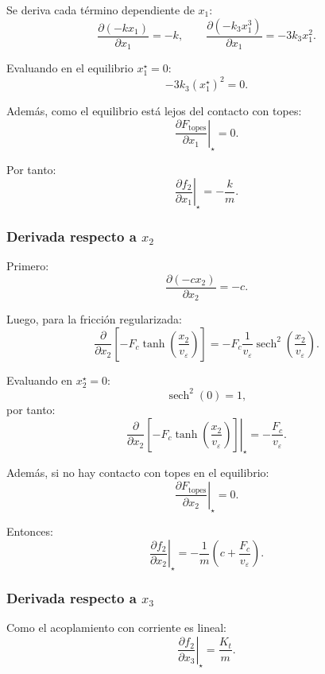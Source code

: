 \documentclass[11pt]{article}
\begin{document}
Se deriva cada t\'ermino dependiente de $x_1$:
\[
\frac{\partial (-kx_1)}{\partial x_1} = -k,
\qquad
\frac{\partial (-k_3x_1^3)}{\partial x_1} = -3k_3x_1^2.
\]

Evaluando en el equilibrio $x_1^\star=0$:
\[
-3k_3(x_1^\star)^2 = 0.
\]

Adem\'as, como el equilibrio est\'a lejos del contacto con topes:
\[
\left.\frac{\partial F_{\text{topes}}}{\partial x_1}\right|_\star = 0.
\]

Por tanto:
\begin{equation}
\left.\frac{\partial f_2}{\partial x_1}\right|_\star
=
-\frac{k}{m}.
\label{eq:df2dx1}
\end{equation}

\subsubsection{Derivada respecto a $x_2$}

Primero:
\[
\frac{\partial (-cx_2)}{\partial x_2}=-c.
\]

Luego, para la fricci\'on regularizada:
\[
\frac{\partial}{\partial x_2}
\left[
-F_c\tanh\left(\frac{x_2}{v_\varepsilon}\right)
\right]
=
-F_c\frac{1}{v_\varepsilon}\operatorname{sech}^2\left(\frac{x_2}{v_\varepsilon}\right).
\]

Evaluando en $x_2^\star=0$:
\[
\operatorname{sech}^2(0)=1,
\]
por tanto:
\[
\left.
\frac{\partial}{\partial x_2}
\left[
-F_c\tanh\left(\frac{x_2}{v_\varepsilon}\right)
\right]
\right|_\star
=
-\frac{F_c}{v_\varepsilon}.
\]

Adem\'as, si no hay contacto con topes en el equilibrio:
\[
\left.\frac{\partial F_{\text{topes}}}{\partial x_2}\right|_\star = 0.
\]

Entonces:
\begin{equation}
\left.\frac{\partial f_2}{\partial x_2}\right|_\star
=
-\frac{1}{m}\left(c+\frac{F_c}{v_\varepsilon}\right).
\label{eq:df2dx2}
\end{equation}

\subsubsection{Derivada respecto a $x_3$}

Como el acoplamiento con corriente es lineal:
\begin{equation}
\left.\frac{\partial f_2}{\partial x_3}\right|_\star
=
\frac{K_t}{m}.
\label{eq:df2dx3}
\end{equation}
\end{document}
